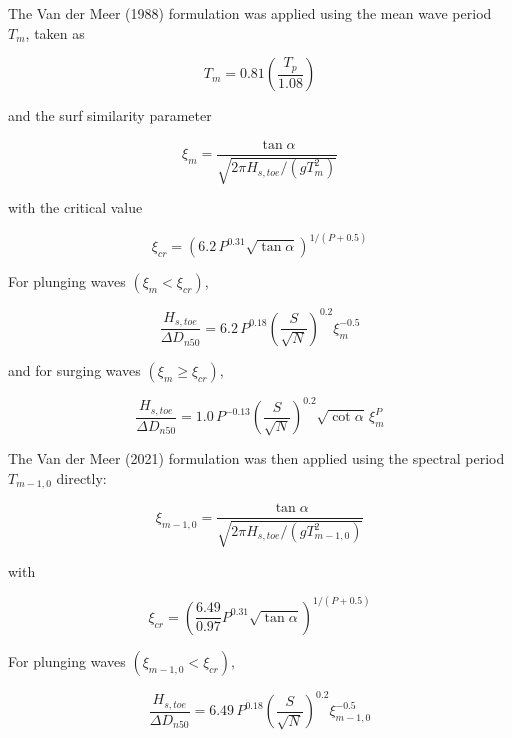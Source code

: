 \documentclass[a4paper, 11pt]{article}
\begin{document}
The Van der Meer (1988) formulation was applied using the mean wave period $T_m$, taken as

\begin{equation}
    T_m = 0.81\left(\frac{T_p}{1.08}\right)
\end{equation}

and the surf similarity parameter

\begin{equation}
    \xi_m=\frac{\tan\alpha}{\sqrt{2\pi H_{s,toe}/(gT_m^2)}}
\end{equation}

with the critical value

\begin{equation}
    \xi_{cr}=\left(6.2\,P^{0.31}\sqrt{\tan\alpha}\right)^{1/(P+0.5)}
\end{equation}

For plunging waves $(\xi_m<\xi_{cr})$,

\begin{equation}
    \frac{H_{s,toe}}{\Delta D_{n50}}=
    6.2\,P^{0.18}\left(\frac{S}{\sqrt{N}}\right)^{0.2}\xi_m^{-0.5}
\end{equation}

and for surging waves $(\xi_m\geq\xi_{cr})$,

\begin{equation}
    \frac{H_{s,toe}}{\Delta D_{n50}}=
    1.0\,P^{-0.13}\left(\frac{S}{\sqrt{N}}\right)^{0.2}
    \sqrt{\cot\alpha}\,\xi_m^{P}
\end{equation}

The Van der Meer (2021) formulation was then applied using the spectral period $T_{m-1,0}$ directly:

\begin{equation}
    \xi_{m-1,0}=\frac{\tan\alpha}{\sqrt{2\pi H_{s,toe}/(gT_{m-1,0}^2)}}
\end{equation}

with

\begin{equation}
    \xi_{cr}=\left(\frac{6.49}{0.97}P^{0.31}\sqrt{\tan\alpha}\right)^{1/(P+0.5)}
\end{equation}

For plunging waves $(\xi_{m-1,0}<\xi_{cr})$,

\begin{equation}
    \frac{H_{s,toe}}{\Delta D_{n50}}=
    6.49\,P^{0.18}\left(\frac{S}{\sqrt{N}}\right)^{0.2}\xi_{m-1,0}^{-0.5}
\end{equation}
\end{document}
